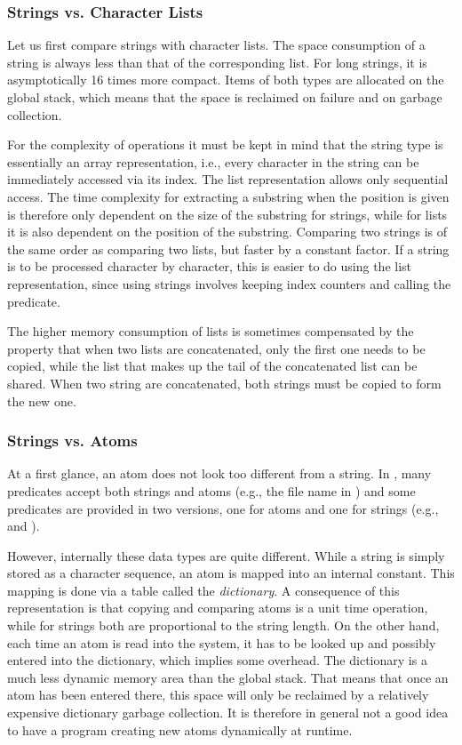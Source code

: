 \subsubsection{Strings vs. Character Lists}
Let us first compare strings with character lists.
The space consumption of a string is always less than that of the corresponding
list. For long strings, it is asymptotically 16 times more compact.
Items of both types are allocated on the global stack, which means that
the space is reclaimed on failure and on garbage collection.

For the complexity of operations it must be kept in mind that the string type
is essentially an array representation, i.e., every character in the string
can be immediately accessed via its index.
The list representation allows only sequential access.
The time complexity for extracting a substring when the position is given
is therefore only dependent on the size of the substring for strings,
while for lists it is also dependent on the position of the substring.
Comparing two strings is of the same order as comparing two lists, but
faster by a constant factor.
If a string is to be processed character by character, this is easier to
do using the list representation, since using strings involves keeping
index counters and calling the
 predicate.

The higher memory consumption of lists is sometimes compensated by the
property that when two lists are concatenated, only the first one needs
to be copied, while the list that makes up the tail of the concatenated
list can be shared.
When two string are concatenated, both strings must be copied to form
the new one.

\subsubsection{Strings vs. Atoms}
At a first glance, an atom does not look too different from a string.
In {\eclipse}, many predicates accept both strings and atoms (e.g.,
the file name
in ) and some predicates are provided in two versions, one for
atoms and one for strings (e.g.,  and
).

However, internally these data types are quite different.
While a string is simply stored as a character sequence, an atom is mapped
into an internal constant.
This mapping is done via a table called the \emph{dictionary}.
A consequence of this representation is that copying and comparing atoms
is a unit time operation,
while for strings both are proportional to the string length.
On the other hand, each time an atom is read into the system, it has to
be looked up and possibly entered into the dictionary, which implies
some overhead.
The dictionary is a much less dynamic memory area than the global stack.
That means that once an atom has been entered there, this space will
only be reclaimed by a relatively expensive dictionary garbage collection.
It is therefore in general not a good idea to have a
program creating new atoms dynamically at runtime.


